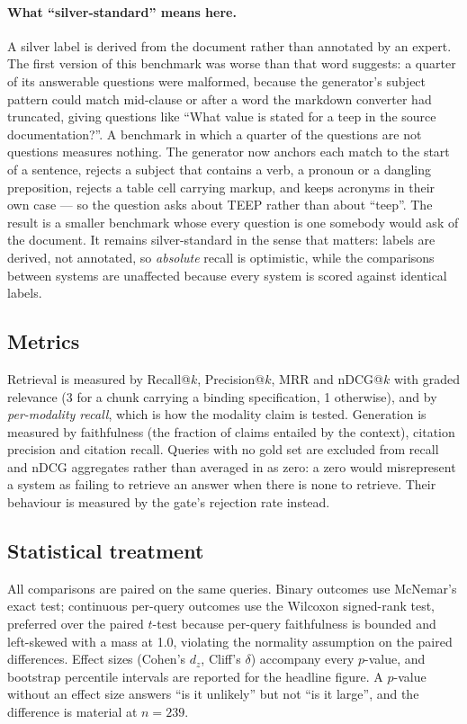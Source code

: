 \documentclass[preprint,3p,times]{elsarticle}
\begin{document}
\paragraph{What ``silver-standard'' means here.} A silver label is derived
from the document rather than annotated by an expert. The first version of this
benchmark was worse than that word suggests: a quarter of its answerable
questions were malformed, because the generator's subject pattern could match
mid-clause or after a word the markdown converter had truncated, giving
questions like ``What value is stated for a teep in the source
documentation?''. A benchmark in which a quarter of the questions are not
questions measures nothing. The generator now anchors each match to the start
of a sentence, rejects a subject that contains a verb, a pronoun or a dangling
preposition, rejects a table cell carrying markup, and keeps acronyms in their
own case --- so the question asks about TEEP rather than about ``teep''. The
result is a smaller benchmark whose every question is one somebody would ask of
the document. It remains silver-standard in the sense that matters: labels are
derived, not annotated, so \emph{absolute} recall is optimistic, while the
comparisons between systems are unaffected because every system is scored
against identical labels.

\subsection{Metrics}

Retrieval is measured by Recall@$k$, Precision@$k$, MRR and nDCG@$k$ with
graded relevance (3 for a chunk carrying a binding specification, 1 otherwise),
and by \emph{per-modality recall}, which is how the modality claim is tested.
Generation is measured by faithfulness (the fraction of claims entailed by the
context), citation precision and citation recall. Queries with no gold set are
excluded from recall and nDCG aggregates rather than averaged in as zero: a zero
would misrepresent a system as failing to retrieve an answer when there is none
to retrieve. Their behaviour is measured by the gate's rejection rate instead.

\subsection{Statistical treatment}

All comparisons are paired on the same queries. Binary outcomes use McNemar's
exact test; continuous per-query outcomes use the Wilcoxon signed-rank test,
preferred over the paired $t$-test because per-query faithfulness is bounded
and left-skewed with a mass at 1.0, violating the normality assumption on the
paired differences. Effect sizes (Cohen's $d_z$, Cliff's $\delta$) accompany
every $p$-value, and bootstrap percentile intervals are reported for the
headline figure. A $p$-value without an effect size answers ``is it
unlikely'' but not ``is it large'', and the difference is material at
$n=239$.
\end{document}
